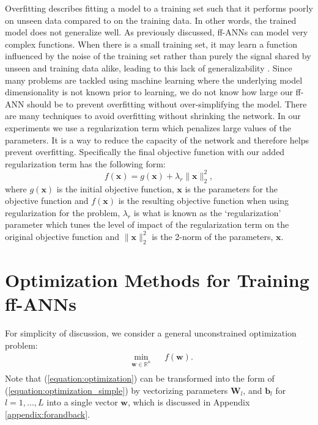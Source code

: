 \documentclass[letterpaper,12pt,titlepage,oneside,final]{book}
\begin{document}
	Overfitting describes fitting a model to a training set such that it performs poorly on unseen data compared to on the training data. In other words, the trained model does not generalize well. As previously discussed, ff-ANNs can model very complex functions. When there is a small training set, it may learn a function influenced by the noise of the training set rather than purely the signal shared by unseen and training data alike, leading to this lack of generalizability \cite{dropout}. Since many problems are tackled using machine learning where the underlying model dimensionality is not known prior to learning, we do not know how large our ff-ANN should be to prevent overfitting without over-simplifying the model. There are many techniques to avoid overfitting without shrinking the network. In our experiments we use a regularization term which penalizes large values of the parameters. It is a way to reduce the capacity of the network and therefore helps prevent overfitting. Specifically the final objective function with our added regularization term has the following form:
	\begin{equation}
	f(\mathbf{x}) = g(\mathbf{x}) + \lambda_{r}\|\mathbf{x}\|_{2}^{2},
	\label{equation:regularization}
	\end{equation}
	where $g(\mathbf{x})$ is the initial objective function, $\mathbf{x}$ is the parameters for the objective function and $f(\mathbf{x})$ is the resulting objective function when using regularization for the problem, $\lambda_{r}$ is what is known as the `regularization' parameter which tunes the level of impact of the regularization term on the original objective function and $\|\mathbf{x}\|_{2}^{2}$ is the 2-norm of the parameters, $\mathbf{x}$.
	
	\section{Optimization Methods for Training ff-ANNs}
	
	For simplicity of discussion, we consider a general unconstrained optimization problem:
	\begin{equation}
	\begin{aligned}
	& \underset{\mathbf{w}\in \mathbb{R}^{n}}{\text{min}}
	& & f(\mathbf{w}).\\
	\end{aligned}
	\label{equation:optimization_simple}
	\end{equation}
	Note that (\ref{equation:optimization}) can be transformed into the form of (\ref{equation:optimization_simple}) by vectorizing parameters $\mathbf{W}_{l}$, and $\mathbf{b}_{l}$ for $l = 1,...,L$ into a single vector $\mathbf{w}$, which is discussed in Appendix \ref{appendix:forandback}.
	
\end{document}
